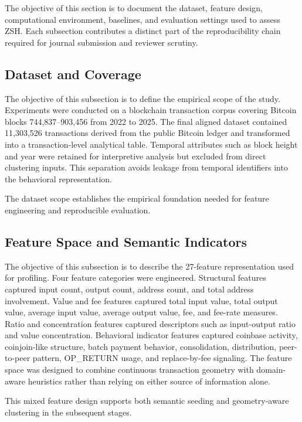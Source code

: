 \documentclass{ieeeaccess}
\begin{document}
The objective of this section is to document the dataset, feature design, computational environment, baselines, and evaluation settings used to assess ZSH. Each subsection contributes a distinct part of the reproducibility chain required for journal submission and reviewer scrutiny.

\subsection{Dataset and Coverage}

The objective of this subsection is to define the empirical scope of the study. Experiments were conducted on a blockchain transaction corpus covering Bitcoin blocks 744,837--903,456 from 2022 to 2025. The final aligned dataset contained 11,303,526 transactions derived from the public Bitcoin ledger and transformed into a transaction-level analytical table. Temporal attributes such as block height and year were retained for interpretive analysis but excluded from direct clustering inputs. This separation avoids leakage from temporal identifiers into the behavioral representation.

The dataset scope establishes the empirical foundation needed for feature engineering and reproducible evaluation.

\subsection{Feature Space and Semantic Indicators}

The objective of this subsection is to describe the 27-feature representation used for profiling. Four feature categories were engineered. Structural features captured input count, output count, address count, and total address involvement. Value and fee features captured total input value, total output value, average input value, average output value, fee, and fee-rate measures. Ratio and concentration features captured descriptors such as input-output ratio and value concentration. Behavioral indicator features captured coinbase activity, coinjoin-like structure, batch payment behavior, consolidation, distribution, peer-to-peer pattern, OP\_RETURN usage, and replace-by-fee signaling. The feature space was designed to combine continuous transaction geometry with domain-aware heuristics rather than relying on either source of information alone.

This mixed feature design supports both semantic seeding and geometry-aware clustering in the subsequent stages.
\end{document}
